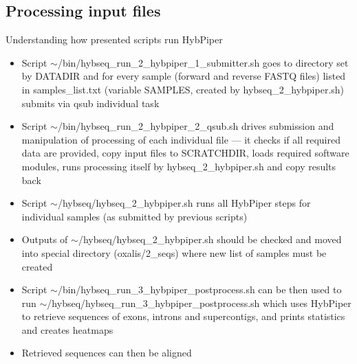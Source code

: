 \documentclass[compress, ucs, xelatex, 11pt, xcolor=x11names, aspectratio=1609,
	hyperref={
		bookmarks=true,
		unicode=true,
		colorlinks=true,
		pdftitle={HybSeq course},
		plainpages=false,
		pdfauthor={Vojtech Zeisek},
		pdfsubject={Practical processing of HybSeq target enrichment sequencing data on computing grids like MetaCentrum},
		pdfcreator={XeLaTeX},
		pdfkeywords={BASH, command line, GNU, HybSeq, Linux, MetaCentrum, sequencing shell, target enrichment},
		linkcolor=Cyan2, %
		anchorcolor=Firebrick2, %
		citecolor=Firebrick2, %
		filecolor=Firebrick2, %
		menucolor=Firebrick2, %
		urlcolor=Chartreuse2, %
		pdftex},
	url={hyphens, lowtilde} %
	]{beamer}
\renewcommand{\texttt}[1]{\colorbox{Snow4}{{\ttfamily #1}}}
\begin{document}
\subsection{Processing input files}

\begin{frame}[allowframebreaks]{Understanding how presented scripts run HybPiper}
	\begin{itemize}
		\item Script \texttt{$\sim$/bin/hybseq\_run\_2\_hybpiper\_1\_submitter.sh} goes to directory set by \texttt{DATADIR} and for every sample (forward and reverse FASTQ files) listed in \texttt{samples\_list.txt} (variable \texttt{SAMPLES}, created by \texttt{hybseq\_2\_hybpiper.sh}) submits via \texttt{qsub} individual task
		\item Script \texttt{$\sim$/bin/hybseq\_run\_2\_hybpiper\_2\_qsub.sh} drives submission and manipulation of processing of each individual file --- it checks if all required data are provided, copy input files to \texttt{SCRATCHDIR}, loads required software modules, runs processing itself by \texttt{hybseq\_2\_hybpiper.sh} and copy results back
		\item Script \texttt{$\sim$/hybseq/hybseq\_2\_hybpiper.sh} runs all HybPiper steps for individual samples (as submitted by previous scripts)
		\item Outputs of \texttt{$\sim$/hybseq/hybseq\_2\_hybpiper.sh} should be checked and moved into special directory (\texttt{oxalis/2\_seqs}) where new list of samples must be created
		\item Script \texttt{$\sim$/bin/hybseq\_run\_3\_hybpiper\_postprocess.sh} can be then used to run \texttt{$\sim$/hybseq/hybseq\_run\_3\_hybpiper\_postprocess.sh} which uses HybPiper to retrieve sequences of exons, introns and supercontigs, and prints statistics and creates heatmaps
		\item Retrieved sequences can then be aligned
	\end{itemize}
\end{frame}
\end{document}
